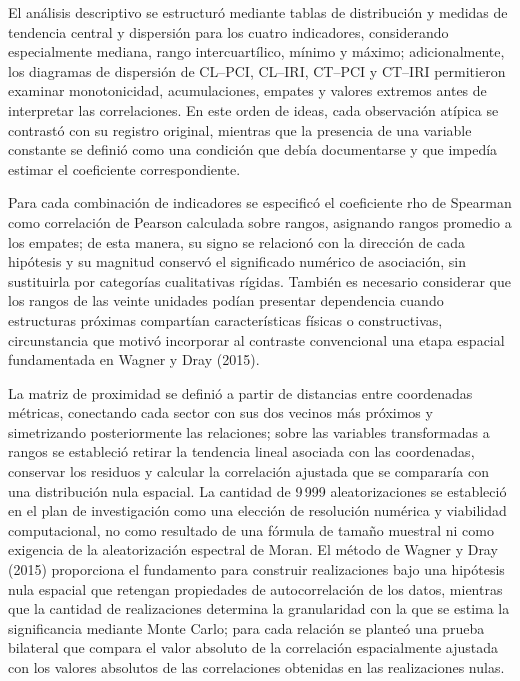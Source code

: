 El análisis descriptivo se estructuró mediante tablas de distribución y medidas de tendencia central y dispersión para los cuatro indicadores, considerando especialmente mediana, rango intercuartílico, mínimo y máximo; adicionalmente, los diagramas de dispersión de CL–PCI, CL–IRI, CT–PCI y CT–IRI permitieron examinar monotonicidad, acumulaciones, empates y valores extremos antes de interpretar las correlaciones. En este orden de ideas, cada observación atípica se contrastó con su registro original, mientras que la presencia de una variable constante se definió como una condición que debía documentarse y que impedía estimar el coeficiente correspondiente.

Para cada combinación de indicadores se especificó el coeficiente rho de Spearman como correlación de Pearson calculada sobre rangos, asignando rangos promedio a los empates; de esta manera, su signo se relacionó con la dirección de cada hipótesis y su magnitud conservó el significado numérico de asociación, sin sustituirla por categorías cualitativas rígidas. También es necesario considerar que los rangos de las veinte unidades podían presentar dependencia cuando estructuras próximas compartían características físicas o constructivas, circunstancia que motivó incorporar al contraste convencional una etapa espacial fundamentada en Wagner y Dray (2015).

La matriz de proximidad se definió a partir de distancias entre coordenadas métricas, conectando cada sector con sus dos vecinos más próximos y simetrizando posteriormente las relaciones; sobre las variables transformadas a rangos se estableció retirar la tendencia lineal asociada con las coordenadas, conservar los residuos y calcular la correlación ajustada que se compararía con una distribución nula espacial. La cantidad de 9\,999 aleatorizaciones se estableció en el plan de investigación como una elección de resolución numérica y viabilidad computacional, no como resultado de una fórmula de tamaño muestral ni como exigencia de la aleatorización espectral de Moran. El método de Wagner y Dray (2015) proporciona el fundamento para construir realizaciones bajo una hipótesis nula espacial que retengan propiedades de autocorrelación de los datos, mientras que la cantidad de realizaciones determina la granularidad con la que se estima la significancia mediante Monte Carlo; para cada relación se planteó una prueba bilateral que compara el valor absoluto de la correlación espacialmente ajustada con los valores absolutos de las correlaciones obtenidas en las realizaciones nulas.

